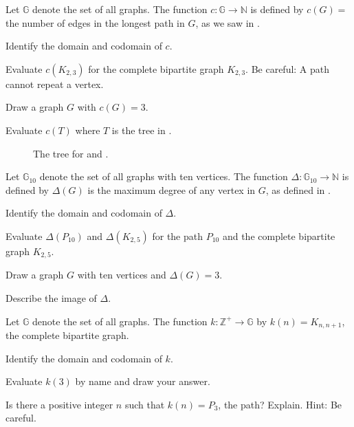 \begin{exer}[\exerP] %
\label{exer_longest_path_fn}
    Let $\mathbb{G}$ denote the set of all graphs. The function $c: \mathbb{G} \to \mathbb{N}$ is defined by $c(G)=$ the number of edges in the longest path in $G$, as we saw in . 
        \begin{exerpart}
            \item Identify the domain and codomain of $c$.
            \item Evaluate $c(K_{2,3})$ for the complete bipartite graph $K_{2,3}$.  Be careful: A path cannot repeat a vertex.
            \item Draw a graph $G$ with $c(G)=3$.
            \item Evaluate $c(T)$ where $T$ is the tree in .
        \end{exerpart}
        
        \begin{figure}[hbtp]
             \centering
             
             \caption{The tree for  and . }
             \label{fig_tree_for_fn_exer}
         \end{figure}
\end{exer}

\begin{exer}[\exerU] %
\label{exer_max_degree_function}
    Let $\mathbb{G}_{10}$ denote the set of all graphs with ten vertices. The function $\Delta:\mathbb{G}_{10} \to \mathbb{N}$ is defined by $\Delta(G)$ is the maximum degree of any vertex in $G$, as defined in . 
        \begin{exerpart}
            \item Identify the domain and codomain of $\Delta$.
            \item Evaluate $\Delta(P_{10})$ and $\Delta(K_{2,5})$ for the path $P_{10}$ and the complete bipartite graph $K_{2,5}$.
            \item Draw a graph $G$ with ten vertices and $\Delta(G)=3$.
            \item Describe the image of $\Delta$.
        \end{exerpart}
\end{exer}

\begin{exer}[\exerU] %
\label{exer_function_builds_graph}
    Let $\mathbb{G}$ denote the set of all graphs. The function $k: \mathbb{Z}^+ \to \mathbb{G}$ by $k(n) = K_{n,n+1}$, the complete bipartite graph.  
        \begin{exerpart}
            \item Identify the domain and codomain of $k$. 
            \item Evaluate $k(3)$ by name and draw your answer.
            \item Is there a positive integer $n$ such that $k(n)=P_3$, the path? Explain. Hint: Be careful.
        \end{exerpart}    
 \end{exer}

